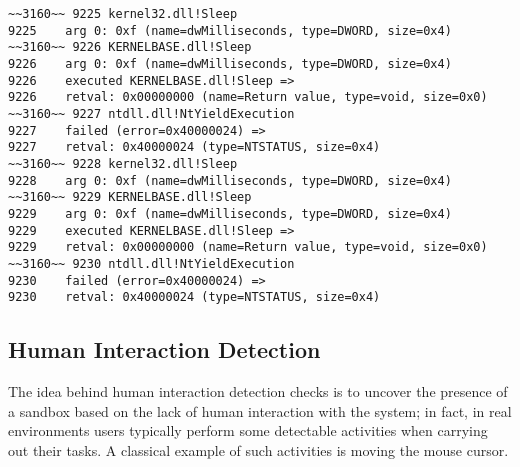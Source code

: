 \vspace{0.5cm}
\begin{lstlisting}[caption={Portion of \texttt{Sleep} loop },captionpos=b]
~~3160~~ 9225 kernel32.dll!Sleep
9225 	arg 0: 0xf (name=dwMilliseconds, type=DWORD, size=0x4)
~~3160~~ 9226 KERNELBASE.dll!Sleep
9226 	arg 0: 0xf (name=dwMilliseconds, type=DWORD, size=0x4)
9226    executed KERNELBASE.dll!Sleep =>
9226 	retval: 0x00000000 (name=Return value, type=void, size=0x0)
~~3160~~ 9227 ntdll.dll!NtYieldExecution
9227    failed (error=0x40000024) =>
9227 	retval: 0x40000024 (type=NTSTATUS, size=0x4)
~~3160~~ 9228 kernel32.dll!Sleep
9228 	arg 0: 0xf (name=dwMilliseconds, type=DWORD, size=0x4)
~~3160~~ 9229 KERNELBASE.dll!Sleep
9229 	arg 0: 0xf (name=dwMilliseconds, type=DWORD, size=0x4)
9229    executed KERNELBASE.dll!Sleep =>
9229 	retval: 0x00000000 (name=Return value, type=void, size=0x0)
~~3160~~ 9230 ntdll.dll!NtYieldExecution
9230    failed (error=0x40000024) =>
9230 	retval: 0x40000024 (type=NTSTATUS, size=0x4)
\end{lstlisting}

\subsection{Human Interaction Detection}

The idea behind human interaction detection checks is to uncover the presence of a sandbox based on the lack of human interaction with the system; in fact, in real environments users typically perform some detectable activities when carrying out their tasks. A classical example of such activities is moving the mouse cursor.  

